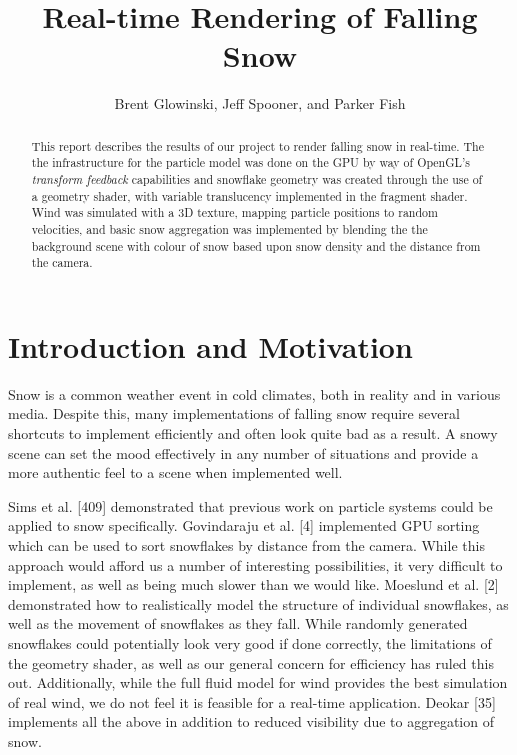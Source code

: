 \documentclass[conference]{acmsiggraph}
\title{Real-time Rendering of Falling Snow}
\author{Brent Glowinski, Jeff Spooner, and Parker Fish}
\begin{document}
\maketitle

\begin{abstract}
This report describes the results of our project to render falling snow in real-time. The the infrastructure for the particle model was done on the GPU by way of OpenGL's \textit{transform feedback} capabilities and snowflake geometry was created through the use of a geometry shader, with variable translucency implemented in the fragment shader. Wind was simulated with a 3D texture, mapping particle positions to random velocities, and basic snow aggregation was implemented by blending the the background scene with colour of snow based upon snow density and the distance from the camera.

\end{abstract}

\keywordlist

\copyrightspace

\section{Introduction and Motivation}
Snow is a common weather event in cold climates, both in reality and in various media. Despite this, many implementations of falling snow require several shortcuts to implement efficiently and often look quite bad as a result. A snowy scene can set the mood effectively in any number of situations and provide a more authentic feel to a scene when implemented well.

Sims et al. [409] demonstrated that previous work on particle systems could be applied to snow specifically. Govindaraju et al. [4] implemented GPU sorting which can be used to sort snowflakes by distance from the camera. While this approach would afford us a number of interesting possibilities, it very difficult to implement, as well as being much slower than we would like. Moeslund et al. [2] demonstrated how to realistically model the structure of individual snowflakes, as well as the movement of snowflakes as they fall. While randomly generated snowflakes could potentially look very good if done correctly, the limitations of the geometry shader, as well as our general concern for efficiency has ruled this out. Additionally, while the full fluid model for wind provides the best simulation of real wind, we do not feel it is feasible for a real-time application. Deokar [35] implements all the above in addition to reduced visibility due to aggregation of snow. 
\end{document}
